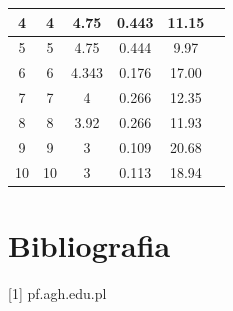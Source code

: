 \documentclass{article}
\begin{document}
\begin{table}[h]
\begin{tabular}{|c|c|c|c|c|c|}
4                                                    & 4                                                  & 4.75                                                            & 0.443                                                      & 11.15                                                             &                                                                    \\ \hline
5                                                    & 5                                                  & 4.75                                                            & 0.444                                                      & 9.97                                                              &                                                                    \\ \hline
6                                                    & 6                                                  & 4.343                                                           & 0.176                                                      & 17.00                                                             &                                                                    \\ \hline
7                                                    & 7                                                  & 4                                                               & 0.266                                                      & 12.35                                                             &                                                                    \\ \hline
8                                                    & 8                                                  & 3.92                                                            & 0.266                                                      & 11.93                                                             &                                                                    \\ \hline
9                                                    & 9                                                  & 3                                                               & 0.109                                                      & 20.68                                                             &                                                                    \\ \hline
10                                                   & 10                                                 & 3                                                               & 0.113                                                      & 18.94                                                             &                                                                    \\ \hline
\end{tabular}
\end{table}

\section{Bibliografia}
[1] pf.agh.edu.pl
\end{document}
